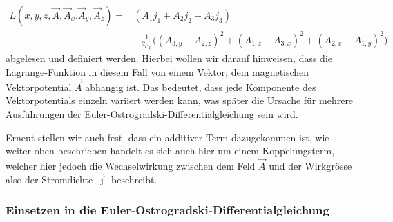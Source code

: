 	\begin{align}
	\label{maxwell:magnetostatikLagrange}
	L\left(x,y,z, \vec{A}, \vec{A}_x. \vec{A}_y, \vec{A}_z\right)
	=&\left( A_1j_1 + A_2j_2 + A_3j_3\right) \\ \nonumber
	 &- \frac{1}{2\mu_0}\bigl( 
	( A_{3,y} - A_{2,z})^2 
	+ (A_{1,z} -A_{3,x})^2
	+ (A_{2,x} -A_{1,y})^2   
	\bigr)
	\end{align}
abgelesen und definiert werden. 
Hierbei wollen wir darauf hinweisen, dass die Lagrange-Funktion in diesem Fall von einem Vektor, dem magnetischen Vektorpotential $\vec{A}$ abhängig ist. 
Das bedeutet, dass jede Komponente des Vektorpotentials einzeln variiert werden kann, was später die Ursache für mehrere Ausführungen der Euler-Ostrogradski-Differentialgleichung sein wird.

Erneut stellen wir auch fest, dass ein additiver Term dazugekommen ist, wie weiter oben beschrieben handelt es sich auch hier um einem Koppelungsterm, welcher hier jedoch die Wechselwirkung zwischen dem Feld $\vec{A}$ und der Wirkgrösse also der Stromdichte $\vec{\jmath}$ beschreibt.

\subsubsection{Einsetzen in die Euler-Ostrogradski-Differentialgleichung}

